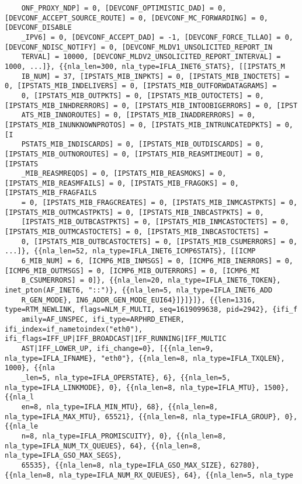 \documentclass[pdf, unicode, 12pt, a4paper,oneside,fleqn]{article}
\begin{document}
{\begin{verbatim}
    ONF_PROXY_NDP] = 0, [DEVCONF_OPTIMISTIC_DAD] = 0, [DEVCONF_ACCEPT_SOURCE_ROUTE] = 0, [DEVCONF_MC_FORWARDING] = 0, [DEVCONF_DISABLE
    _IPV6] = 0, [DEVCONF_ACCEPT_DAD] = -1, [DEVCONF_FORCE_TLLAO] = 0, [DEVCONF_NDISC_NOTIFY] = 0, [DEVCONF_MLDV1_UNSOLICITED_REPORT_IN
    TERVAL] = 10000, [DEVCONF_MLDV2_UNSOLICITED_REPORT_INTERVAL] = 1000, ...]}, {{nla_len=300, nla_type=IFLA_INET6_STATS}, [[IPSTATS_M
    IB_NUM] = 37, [IPSTATS_MIB_INPKTS] = 0, [IPSTATS_MIB_INOCTETS] = 0, [IPSTATS_MIB_INDELIVERS] = 0, [IPSTATS_MIB_OUTFORWDATAGRAMS] =
    0, [IPSTATS_MIB_OUTPKTS] = 0, [IPSTATS_MIB_OUTOCTETS] = 0, [IPSTATS_MIB_INHDRERRORS] = 0, [IPSTATS_MIB_INTOOBIGERRORS] = 0, [IPST
    ATS_MIB_INNOROUTES] = 0, [IPSTATS_MIB_INADDRERRORS] = 0, [IPSTATS_MIB_INUNKNOWNPROTOS] = 0, [IPSTATS_MIB_INTRUNCATEDPKTS] = 0, [I
    PSTATS_MIB_INDISCARDS] = 0, [IPSTATS_MIB_OUTDISCARDS] = 0, [IPSTATS_MIB_OUTNOROUTES] = 0, [IPSTATS_MIB_REASMTIMEOUT] = 0, [IPSTATS
    _MIB_REASMREQDS] = 0, [IPSTATS_MIB_REASMOKS] = 0, [IPSTATS_MIB_REASMFAILS] = 0, [IPSTATS_MIB_FRAGOKS] = 0, [IPSTATS_MIB_FRAGFAILS
    = 0, [IPSTATS_MIB_FRAGCREATES] = 0, [IPSTATS_MIB_INMCASTPKTS] = 0, [IPSTATS_MIB_OUTMCASTPKTS] = 0, [IPSTATS_MIB_INBCASTPKTS] = 0,
    [IPSTATS_MIB_OUTBCASTPKTS] = 0, [IPSTATS_MIB_INMCASTOCTETS] = 0, [IPSTATS_MIB_OUTMCASTOCTETS] = 0, [IPSTATS_MIB_INBCASTOCTETS] =
    0, [IPSTATS_MIB_OUTBCASTOCTETS] = 0, [IPSTATS_MIB_CSUMERRORS] = 0, ...]}, {{nla_len=52, nla_type=IFLA_INET6_ICMP6STATS}, [[ICMP
    6_MIB_NUM] = 6, [ICMP6_MIB_INMSGS] = 0, [ICMP6_MIB_INERRORS] = 0, [ICMP6_MIB_OUTMSGS] = 0, [ICMP6_MIB_OUTERRORS] = 0, [ICMP6_MI
    B_CSUMERRORS] = 0]}, {{nla_len=20, nla_type=IFLA_INET6_TOKEN}, inet_pton(AF_INET6, "::")}, {{nla_len=5, nla_type=IFLA_INET6_ADD
    R_GEN_MODE}, IN6_ADDR_GEN_MODE_EUI64}]}]}]}, {{len=1316, type=RTM_NEWLINK, flags=NLM_F_MULTI, seq=1619099638, pid=2942}, {ifi_f
    amily=AF_UNSPEC, ifi_type=ARPHRD_ETHER, ifi_index=if_nametoindex("eth0"), ifi_flags=IFF_UP|IFF_BROADCAST|IFF_RUNNING|IFF_MULTIC
    AST|IFF_LOWER_UP, ifi_change=0}, [{{nla_len=9, nla_type=IFLA_IFNAME}, "eth0"}, {{nla_len=8, nla_type=IFLA_TXQLEN}, 1000}, {{nla
    _len=5, nla_type=IFLA_OPERSTATE}, 6}, {{nla_len=5, nla_type=IFLA_LINKMODE}, 0}, {{nla_len=8, nla_type=IFLA_MTU}, 1500}, {{nla_l
    en=8, nla_type=IFLA_MIN_MTU}, 68}, {{nla_len=8, nla_type=IFLA_MAX_MTU}, 65521}, {{nla_len=8, nla_type=IFLA_GROUP}, 0}, {{nla_le
    n=8, nla_type=IFLA_PROMISCUITY}, 0}, {{nla_len=8, nla_type=IFLA_NUM_TX_QUEUES}, 64}, {{nla_len=8, nla_type=IFLA_GSO_MAX_SEGS}, 
    65535}, {{nla_len=8, nla_type=IFLA_GSO_MAX_SIZE}, 62780}, {{nla_len=8, nla_type=IFLA_NUM_RX_QUEUES}, 64}, {{nla_len=5, nla_type

\end{verbatim}}
\end{document}
